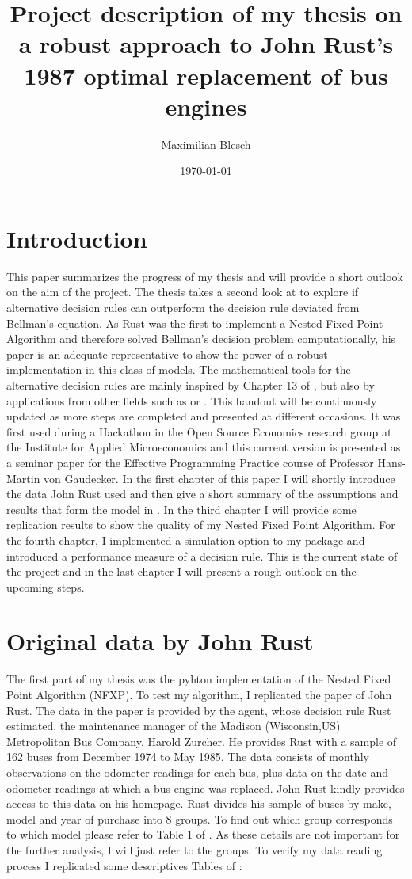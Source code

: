 \documentclass[a4paper,12pt,bold]{scrartcl}
\title{Project description of my thesis on a robust approach to John Rust's 1987 optimal replacement of bus engines}
\author{Maximilian Blesch}
\date{\today}
\begin{document}
\maketitle
\newpage
\tableofcontents
\newpage
\section{Introduction}
This paper summarizes the progress of my thesis and will provide a short outlook on the aim of the project. The thesis takes a second look at \cite{Rust.1987} to explore if alternative decision rules can outperform the decision rule deviated from Bellman's equation. As Rust was the first to implement a Nested Fixed Point Algorithm and therefore solved Bellman's decision problem computationally, his paper is an adequate representative to show the power of a robust implementation in this class of models. The mathematical tools for the alternative decision rules are mainly inspired by Chapter 13 of \cite{Ben-Tal.2009}, but also by applications from other fields such as \cite{Kaufman.2017} or \cite{Ben-Tal.2011}. This handout will be continuously updated as more steps are completed and presented at different occasions. It was first used during a Hackathon in the Open Source Economics research group at the Institute for Applied Microeconomics and this current version is presented as a seminar paper for the Effective Programming Practice course of Professor Hans-Martin von Gaudecker. In the first chapter of this paper I will shortly introduce the data John Rust used and then give a short summary of the assumptions and results that form the model in \cite{Rust.1987}. In the third chapter I will provide some replication results to show the quality of my Nested Fixed Point Algorithm. For the fourth chapter, I implemented a simulation option to my package and introduced a performance measure of a decision rule. This is the current state of the project and in the last chapter I will present a rough outlook on the upcoming steps.

\section{Original data by John Rust}
The first part of my thesis was the pyhton implementation of the Nested Fixed Point Algorithm (NFXP). To test my algorithm, I replicated the paper of John Rust. The data in the paper is provided by the agent, whose decision rule Rust estimated, the maintenance manager of the Madison (Wisconsin,US) Metropolitan Bus Company, Harold Zurcher. He provides Rust with a sample of 162 buses from December 1974 to May 1985. The data consists of monthly observations on the odometer readings for each bus, plus data on the date and odometer readings at which a bus engine was replaced. John Rust kindly provides access to this data on his homepage. Rust divides his sample of buses by make, model and year of purchase into 8 groups. To find out which group corresponds to which model please refer to Table 1 of \cite{Rust.1987}. As these details are not important for the further analysis, I will just refer to the groups. To verify my data reading process I replicated some descriptives Tables of \cite{Rust.1987}:
\end{document}
